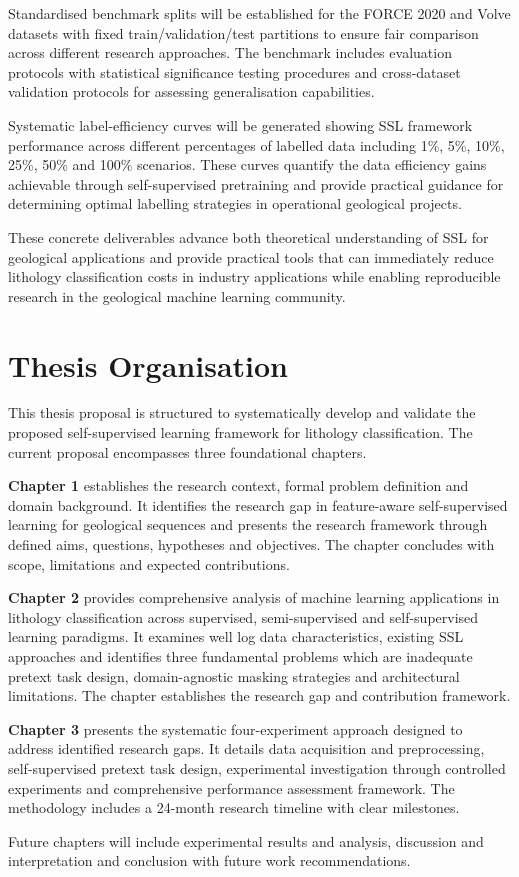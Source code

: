 Standardised benchmark splits will be established for the FORCE 2020 and Volve datasets with fixed train/validation/test partitions to ensure fair comparison across different research approaches. The benchmark includes evaluation protocols with statistical significance testing procedures and cross-dataset validation protocols for assessing generalisation capabilities.

Systematic label-efficiency curves will be generated showing SSL framework performance across different percentages of labelled data including 1\%, 5\%, 10\%, 25\%, 50\% and 100\% scenarios. These curves quantify the data efficiency gains achievable through self-supervised pretraining and provide practical guidance for determining optimal labelling strategies in operational geological projects.

These concrete deliverables advance both theoretical understanding of SSL for geological applications and provide practical tools that can immediately reduce lithology classification costs in industry applications while enabling reproducible research in the geological machine learning community.


\section{Thesis Organisation}

This thesis proposal is structured to systematically develop and validate the proposed self-supervised learning framework for lithology classification. The current proposal encompasses three foundational chapters.

\textbf{Chapter 1} establishes the research context, formal problem definition and domain background. It identifies the research gap in feature-aware self-supervised learning for geological sequences and presents the research framework through defined aims, questions, hypotheses and objectives. The chapter concludes with scope, limitations and expected contributions.

\textbf{Chapter 2} provides comprehensive analysis of machine learning applications in lithology classification across supervised, semi-supervised and self-supervised learning paradigms. It examines well log data characteristics, existing SSL approaches and identifies three fundamental problems which are inadequate pretext task design, domain-agnostic masking strategies and architectural limitations. The chapter establishes the research gap and contribution framework.

\textbf{Chapter 3} presents the systematic four-experiment approach designed to address identified research gaps. It details data acquisition and preprocessing, self-supervised pretext task design, experimental investigation through controlled experiments and comprehensive performance assessment framework. The methodology includes a 24-month research timeline with clear milestones.

Future chapters will include experimental results and analysis, discussion and interpretation and conclusion with future work recommendations.
